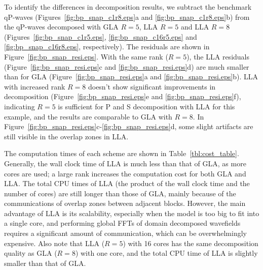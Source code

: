 \documentclass[manuscript,ulem,graphix,revised]{geophysics}
\begin{document}
To identify the differences in decomposition results, we subtract the benchmark qP-waves (Figures~\ref{fig:bp_snap_c1r8.eps}a and \ref{fig:bp_snap_c1r8.eps}b) from the qP-waves decomposed with GLA $R=5$, LLA $R=5$ and LLA $R=8$ (Figures~\ref{fig:bp_snap_c1r5.eps}, \ref{fig:bp_snap_c16r5.eps} and \ref{fig:bp_snap_c16r8.eps}, respectively). The residuals are shown in Figure~\ref{fig:bp_snap_resi.eps}.
With the same rank ($R=5$), the LLA residuals (Figure~\ref{fig:bp_snap_resi.eps}c and \ref{fig:bp_snap_resi.eps}d) are much smaller than for GLA (Figure~\ref{fig:bp_snap_resi.eps}a and \ref{fig:bp_snap_resi.eps}b). LLA with increased rank $R=8$ doesn't show significant improvements in decomposition (Figure~\ref{fig:bp_snap_resi.eps}e and \ref{fig:bp_snap_resi.eps}f), indicating $R=5$ is sufficient for P and S decomposition with LLA for this example, and the results are comparable to GLA with $R=8$. In Figure~\ref{fig:bp_snap_resi.eps}c-\ref{fig:bp_snap_resi.eps}d, some slight artifacts are still visible in the overlap zones in LLA.  

The computation times of each scheme are shown in Table~\ref{tbl:cost_table}. Generally, the wall clock time of LLA is much less than that of GLA, as more cores are used; a large rank increases the computation cost for both GLA and LLA. The total CPU times of LLA (the product of the wall clock time and the number of cores) are still longer than those of GLA, mainly because of the communications of overlap zones between adjacent blocks. However, the main advantage of LLA is its scalability, especially when the model is too big to fit into a single core, and performing global FFTs of domain decomposed wavefields requires a significant amount of communication, which can be overwhelmingly expensive.
Also note that LLA ($R=5$) with 16 cores has the same decomposition quality as GLA ($R=8$) with one core, and the total CPU time of LLA is slightly smaller than that of GLA.
\end{document}
